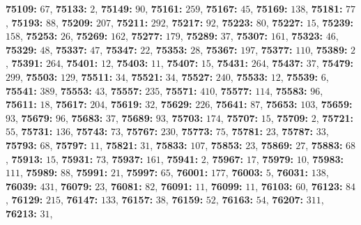 \textsf{\bfseries 75109:} $67$, \textsf{\bfseries 75133:} $2$, \textsf{\bfseries 75149:} $90$, \textsf{\bfseries 75161:} $259$, \textsf{\bfseries 75167:} $45$, \textsf{\bfseries 75169:} $138$, \textsf{\bfseries 75181:} $77$, \textsf{\bfseries 75193:} $88$, \textsf{\bfseries 75209:} $207$, \textsf{\bfseries 75211:} $292$, \textsf{\bfseries 75217:} $92$, \textsf{\bfseries 75223:} $80$, \textsf{\bfseries 75227:} $15$, \textsf{\bfseries 75239:} $158$, \textsf{\bfseries 75253:} $26$, \textsf{\bfseries 75269:} $162$, \textsf{\bfseries 75277:} $179$, \textsf{\bfseries 75289:} $37$, \textsf{\bfseries 75307:} $161$, \textsf{\bfseries 75323:} $46$, \textsf{\bfseries 75329:} $48$, \textsf{\bfseries 75337:} $47$, \textsf{\bfseries 75347:} $22$, \textsf{\bfseries 75353:} $28$, \textsf{\bfseries 75367:} $197$, \textsf{\bfseries 75377:} $110$, \textsf{\bfseries 75389:} $2$, \textsf{\bfseries 75391:} $264$, \textsf{\bfseries 75401:} $12$, \textsf{\bfseries 75403:} $11$, \textsf{\bfseries 75407:} $15$, \textsf{\bfseries 75431:} $264$, \textsf{\bfseries 75437:} $37$, \textsf{\bfseries 75479:} $299$, \textsf{\bfseries 75503:} $129$, \textsf{\bfseries 75511:} $34$, \textsf{\bfseries 75521:} $34$, \textsf{\bfseries 75527:} $240$, \textsf{\bfseries 75533:} $12$, \textsf{\bfseries 75539:} $6$, \textsf{\bfseries 75541:} $389$, \textsf{\bfseries 75553:} $43$, \textsf{\bfseries 75557:} $235$, \textsf{\bfseries 75571:} $410$, \textsf{\bfseries 75577:} $114$, \textsf{\bfseries 75583:} $96$, \textsf{\bfseries 75611:} $18$, \textsf{\bfseries 75617:} $204$, \textsf{\bfseries 75619:} $32$, \textsf{\bfseries 75629:} $226$, \textsf{\bfseries 75641:} $87$, \textsf{\bfseries 75653:} $103$, \textsf{\bfseries 75659:} $93$, \textsf{\bfseries 75679:} $96$, \textsf{\bfseries 75683:} $37$, \textsf{\bfseries 75689:} $93$, \textsf{\bfseries 75703:} $174$, \textsf{\bfseries 75707:} $15$, \textsf{\bfseries 75709:} $2$, \textsf{\bfseries 75721:} $55$, \textsf{\bfseries 75731:} $136$, \textsf{\bfseries 75743:} $73$, \textsf{\bfseries 75767:} $230$, \textsf{\bfseries 75773:} $75$, \textsf{\bfseries 75781:} $23$, \textsf{\bfseries 75787:} $33$, \textsf{\bfseries 75793:} $68$, \textsf{\bfseries 75797:} $11$, \textsf{\bfseries 75821:} $31$, \textsf{\bfseries 75833:} $107$, \textsf{\bfseries 75853:} $23$, \textsf{\bfseries 75869:} $27$, \textsf{\bfseries 75883:} $68$, \textsf{\bfseries 75913:} $15$, \textsf{\bfseries 75931:} $73$, \textsf{\bfseries 75937:} $161$, \textsf{\bfseries 75941:} $2$, \textsf{\bfseries 75967:} $17$, \textsf{\bfseries 75979:} $10$, \textsf{\bfseries 75983:} $111$, \textsf{\bfseries 75989:} $88$, \textsf{\bfseries 75991:} $21$, \textsf{\bfseries 75997:} $65$, \textsf{\bfseries 76001:} $177$, \textsf{\bfseries 76003:} $5$, \textsf{\bfseries 76031:} $138$, \textsf{\bfseries 76039:} $431$, \textsf{\bfseries 76079:} $23$, \textsf{\bfseries 76081:} $82$, \textsf{\bfseries 76091:} $11$, \textsf{\bfseries 76099:} $11$, \textsf{\bfseries 76103:} $60$, \textsf{\bfseries 76123:} $84$, \textsf{\bfseries 76129:} $215$, \textsf{\bfseries 76147:} $133$, \textsf{\bfseries 76157:} $38$, \textsf{\bfseries 76159:} $52$, \textsf{\bfseries 76163:} $54$, \textsf{\bfseries 76207:} $311$, \textsf{\bfseries 76213:} $31$, 
